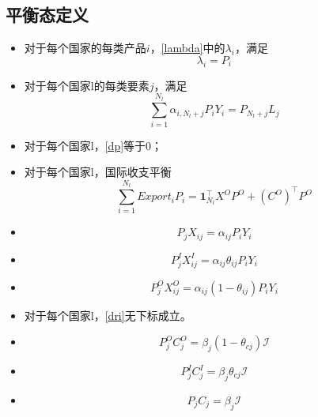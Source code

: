 \documentclass{article}
\begin{document}
\subsection{平衡态定义}
\begin{itemize}
    \item 对于每个国家的每类产品$i$，\eqref{lambda}中的$\lambda_i$，满足
\begin{equation}
    \lambda_i=P_i
\end{equation}
\item 对于每个国家l的每类要素$j$，满足
\begin{equation}\label{e0}
    \sum_{i=1}^{N_l}\alpha_{i,N_l+j}P_iY_i=P_{N_l+j}L_j
\end{equation}
\item 对于每个国家l，\eqref{dp}等于0；
\item 对于每个国家l，国际收支平衡
\begin{equation}
    \sum_{i=1}^{N_l}Export_i P_i=\mathbf{1}_{N_l}^\top X^O P^O+(C^O)^\top P^O
\end{equation}
\item \begin{equation}\label{e1}
    P_jX_{ij}=\alpha_{ij}P_iY_i
\end{equation}
\item \begin{equation}\label{e2}
    P_j^IX^I_{ij}=\alpha_{ij}\theta_{ij}P_iY_i
\end{equation}
\item \begin{equation}\label{e3}
    P_j^OX^O_{ij}=\alpha_{ij}(1-\theta_{ij})P_iY_i
\end{equation}
\item 对于每个国家l，\eqref{dri}无下标成立。
\item \begin{equation}\label{e4}
    P_j^OC^O_{j}=\beta_{j}(1-\theta_{cj})\mathcal{I}
\end{equation}
\item \begin{equation}\label{e5}
    P_j^IC^I_{j}=\beta_{j}\theta_{cj}\mathcal{I}
\end{equation}
\item \begin{equation}\label{e6}
    P_jC_{j}=\beta_{j}\mathcal{I}
\end{equation}
\end{itemize}
\end{document}
